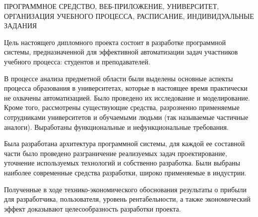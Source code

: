 \thispagestyle{empty}


\begin{center}
	\MakeUppercase{Программное средство, веб-приложение, университет, организация учебного процесса, расписание, индивидуальные задания}
\end{center}

Цель настоящего дипломного проекта состоит в разработке программной системы, предназначенной для эффективной автоматизации задач участников учебного процесса: студентов и преподавателей. 

В процессе анализа предметной области были выделены основные аспекты процесса образования в университетах, которые в настоящее время практически не охвачены автоматизацией. Было проведено их исследование и моделирование. Кроме того, рассмотрены существующие средства, разрозненно применяемые сотрудниками университетов и обучаемыми людьми (так называемые частичные аналоги). Выработаны функциональные и нефункциональные требования.

Была разработана архитектура программной системы, для каждой ее составной части было проведено разграничение реализуемых задач проектирование, уточнение используемых технологий и собственно разработка. Были выбраны наиболее современные средства разработки, широко применяемые в индустрии. 

Полученные в ходе технико-экономического обоснования результаты о прибыли для разработчика, пользователя, уровень рентабельности, а также экономический эффект доказывают целесообразность разработки проекта.
